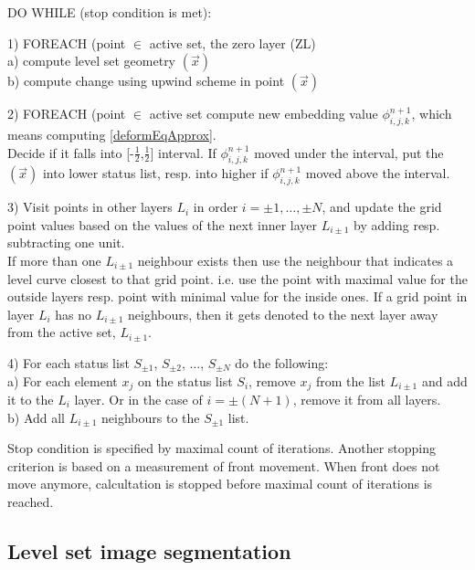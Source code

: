 \par
DO WHILE (stop condition is met):
\par
1) FOREACH (point $\in$ active set, the zero layer (ZL)\\
  a) compute level set geometry $(\vec x)$\\
  b) compute change using upwind scheme in point $(\vec x)$
\par
2) FOREACH (point $\in$ active set compute new embedding value $\phi_{i,j,k}^{n+1}$, which means computing \ref{deformEqApprox}.\\
Decide if it falls into [-$\frac{1}{2}$,$\frac{1}{2}$] interval.
If $\phi_{i,j,k}^{n+1}$ moved under the interval, put the $(\vec x)$ into lower status list, resp. into higher if $\phi_{i,j,k}^{n+1}$ moved above the interval.
\par
3) Visit points in other layers $L_i$ in order $i=\pm 1,\ldots, \pm N$, and update the grid point values based on the values of the next inner layer $L_{i\pm1}$ by adding resp. subtracting one unit.\\
If more than one $L_{i\pm1}$ neighbour exists then use the neighbour that indicates a level curve closest to that grid point. i.e. use the point with maximal value for the outside layers resp. point with minimal value for the inside ones.
If a grid point in layer $L_i$ has no $L_{i\pm1}$ neighbours, then it gets denoted to the next layer away from the active set, $L_{i\pm1}$.
\par
4) For each status list $S_{\pm1}$, $S_{\pm2}$, $\ldots$, $S_{\pm N}$ do the following:\\
  a) For each element $x_j$ on the status list $S_i$, remove $x_j$ from the list $L_{i\pm1}$ and add it to the $L_{i}$ layer.
Or in the case of $i=\pm (N + 1)$, remove it from all layers.\\
  b) Add all $L_{i\pm1}$ neighbours to the $S_{\pm1}$ list.

\par
Stop condition is specified by maximal count of iterations.
Another stopping criterion is based on a measurement of front movement.
When front does not move anymore, calcultation is stopped before maximal count of iterations is reached.

\subsection{Level set image segmentation}

